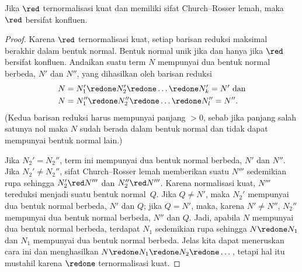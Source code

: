 \documentclass[../../../include/open-logic-section]{subfiles}
\begin{document}
\begin{lem}
Jika $\red$ ternormalisasi kuat dan memiliki sifat Church--Rosser lemah,
maka $\red$ bersifat konfluen.
\end{lem}

\begin{proof}
  Karena $\red$ ternormalisasi kuat, setiap barisan reduksi maksimal
  berakhir dalam bentuk normal. Bentuk normal unik jika dan hanya jika
  $\red$ bersifat konfluen. Andaikan suatu term $N$ mempunyai dua bentuk
  normal berbeda, $N'$ dan $N''$, yang dihasilkan oleh barisan reduksi
  \begin{align*}
  N & = N_1' \redone N_2' \redone \dots \redone N_k' = N'
    \text{ dan}\\
  N & = N_1'' \redone N_2'' \redone \dots \redone N_l'' = N''.
  \end{align*}
  (Kedua barisan reduksi harus mempunyai panjang $>0$, sebab jika panjang
  salah satunya nol maka $N$ sudah berada dalam bentuk normal dan
  tidak dapat mempunyai bentuk normal lain.)

  Jika $N_2'=N_2''$, term ini mempunyai dua bentuk normal berbeda,
  $N'$ dan $N''$. Jika $N_2' \neq N_2''$, sifat Church--Rosser lemah
  memberikan suatu $N'''$ sedemikian rupa sehingga $N_2' \red N'''$
  dan $N_2'' \red N'''$. Karena normalisasi kuat, $N'''$ tereduksi
  menjadi suatu bentuk normal~$Q$. Jika $Q \neq N'$, maka $N_2'$
  mempunyai dua bentuk normal berbeda, $N'$ dan $Q$; jika $Q=N'$,
  maka, karena $N'\neq N''$, $N_2''$ mempunyai dua bentuk normal
  berbeda, $N''$ dan $Q$. Jadi, apabila $N$ mempunyai dua bentuk normal
  berbeda, terdapat $N_1$ sedemikian rupa sehingga $N \redone N_1$ dan
  $N_1$ mempunyai dua bentuk normal berbeda. Jelas kita dapat meneruskan
  cara ini dan menghasilkan $N \redone N_1 \redone N_2 \redone \dots$,
  tetapi hal itu mustahil karena $\redone$ ternormalisasi kuat.
\end{proof}
\end{document}
